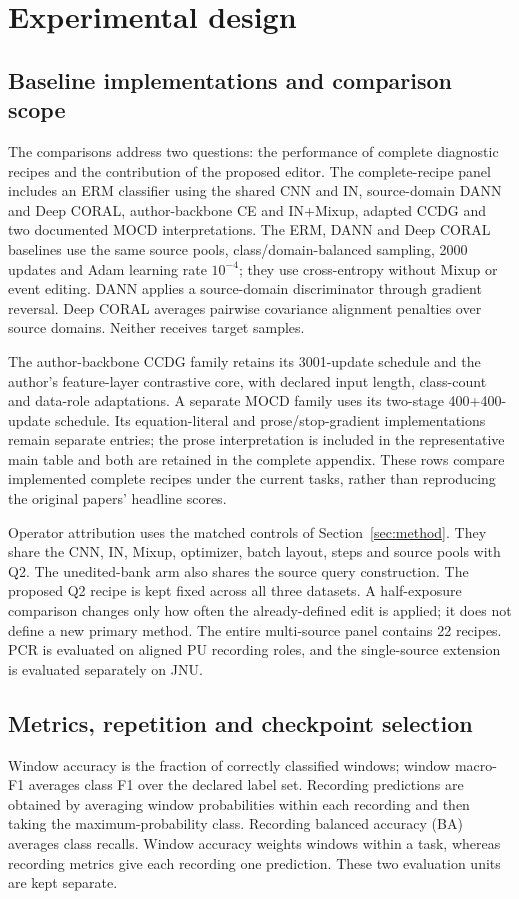 \documentclass[a4paper,fleqn]{cas-sc}
\begin{document}


\section{Experimental design}
\label{sec:experiments}


\subsection{Baseline implementations and comparison scope}
The comparisons address two questions: the performance of complete diagnostic recipes and the contribution of the proposed editor. The complete-recipe panel includes an ERM classifier using the shared CNN and IN, source-domain DANN and Deep CORAL, author-backbone CE and IN+Mixup, adapted CCDG and two documented MOCD interpretations. The ERM, DANN and Deep CORAL baselines use the same source pools, class/domain-balanced sampling, 2000 updates and Adam learning rate $10^{-4}$; they use cross-entropy without Mixup or event editing. DANN applies a source-domain discriminator through gradient reversal. Deep CORAL averages pairwise covariance alignment penalties over source domains. Neither receives target samples.

The author-backbone CCDG family retains its 3001-update schedule and the author's feature-layer contrastive core, with declared input length, class-count and data-role adaptations. A separate MOCD family uses its two-stage 400+400-update schedule. Its equation-literal and prose/stop-gradient implementations remain separate entries; the prose interpretation is included in the representative main table and both are retained in the complete appendix. These rows compare implemented complete recipes under the current tasks, rather than reproducing the original papers' headline scores.

Operator attribution uses the matched controls of Section~\ref{sec:method}. They share the CNN, IN, Mixup, optimizer, batch layout, steps and source pools with Q2. The unedited-bank arm also shares the source query construction. The proposed Q2 recipe is kept fixed across all three datasets. A half-exposure comparison changes only how often the already-defined edit is applied; it does not define a new primary method. The entire multi-source panel contains 22 recipes. PCR is evaluated on aligned PU recording roles, and the single-source extension is evaluated separately on JNU.

\subsection{Metrics, repetition and checkpoint selection}
Window accuracy is the fraction of correctly classified windows; window macro-F1 averages class F1 over the declared label set. Recording predictions are obtained by averaging window probabilities within each recording and then taking the maximum-probability class. Recording balanced accuracy (BA) averages class recalls. Window accuracy weights windows within a task, whereas recording metrics give each recording one prediction. These two evaluation units are kept separate.
\end{document}

